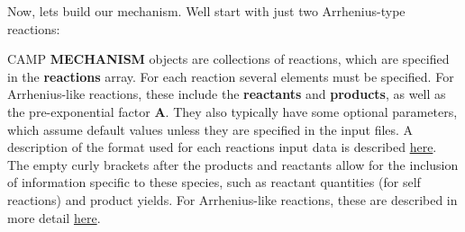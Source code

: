 Now, let\textquotesingle{}s build our mechanism. We\textquotesingle{}ll start with just two Arrhenius-\/type reactions\+: 
\begin{DoxyCode}{0}
\DoxyCodeLine{\{}
\DoxyCodeLine{  "{}reactions"{} : [}
\DoxyCodeLine{    \{}
\DoxyCodeLine{      \},}
\DoxyCodeLine{      \},}
\DoxyCodeLine{    \},}
\DoxyCodeLine{    \{}
\DoxyCodeLine{      \},}
\DoxyCodeLine{     \},}
\DoxyCodeLine{    \},}
\DoxyCodeLine{    \{}
\DoxyCodeLine{      \},}
\DoxyCodeLine{      \},}
\DoxyCodeLine{    \}}
\DoxyCodeLine{  ]}
\DoxyCodeLine{\}}

\end{DoxyCode}
 CAMP {\bfseries{MECHANISM}} objects are collections of reactions, which are specified in the {\bfseries{reactions}} array. For each reaction several elements must be specified. For Arrhenius-\/like reactions, these include the {\bfseries{reactants}} and {\bfseries{products}}, as well as the pre-\/exponential factor {\bfseries{A}}. They also typically have some optional parameters, which assume default values unless they are specified in the input files. A description of the format used for each reaction\textquotesingle{}s input data is described \mbox{\hyperlink{camp_rxn}{here}}. The empty curly brackets after the products and reactants allow for the inclusion of information specific to these species, such as reactant quantities (for self reactions) and product yields. For Arrhenius-\/like reactions, these are described in more detail \mbox{\hyperlink{camp_rxn_arrhenius}{here}}.

